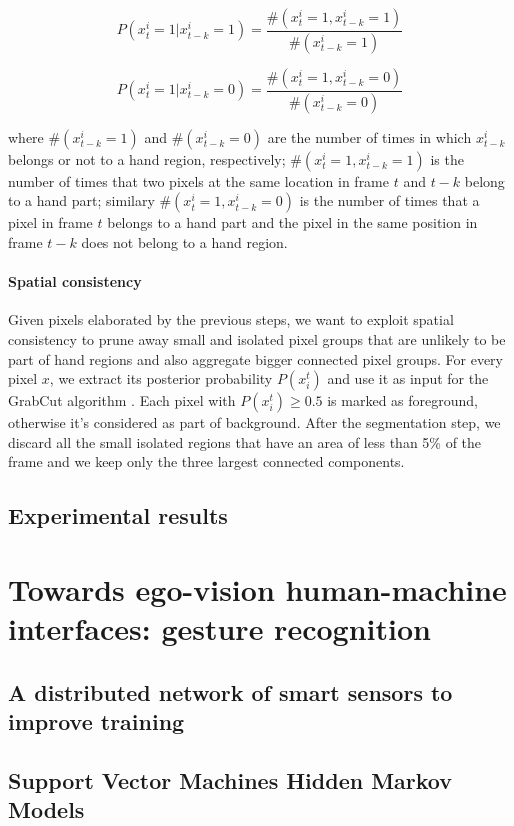 \documentclass[11pt, oneside]{Thesis} %
\begin{document}
\[
P(x_{t}^{i}=1|x_{t-k}^{i}=1)=\frac{\#(x_{t}^{i}=1,x_{t-k}^{i}=1)}{\#(x_{t-k}^{i}=1)}
\]


\begin{equation}
P(x_{t}^{i}=1|x_{t-k}^{i}=0)=\frac{\#(x_{t}^{i}=1,x_{t-k}^{i}=0)}{\#(x_{t-k}^{i}=0)}
\end{equation}


where $\#(x_{t-k}^{i}=1)$ and $\#(x_{t-k}^{i}=0)$ are the number
of times in which $x_{t-k}^{i}$ belongs or not to a hand region,
respectively; $\#(x_{t}^{i}=1,x_{t-k}^{i}=1)$ is the number of times
that two pixels at the same location in frame $t$ and $t-k$ belong
to a hand part; similary $\#(x_{t}^{i}=1,x_{t-k}^{i}=0)$ is the number
of times that a pixel in frame $t$ belongs to a hand part and the
pixel in the same position in frame $t-k$ does not belong to a hand
region. 


\subsubsection{Spatial consistency}

Given pixels elaborated by the previous steps, we want to exploit
spatial consistency to prune away small and isolated pixel groups
that are unlikely to be part of hand regions and also aggregate bigger
connected pixel groups. For every pixel $x$, we extract its posterior
probability $P(x_{i}^{t})$ and use it as input for the GrabCut algorithm
\cite{rother2004grabcut}. Each pixel with $P(x_{i}^{t})\geq0.5$
is marked as foreground, otherwise it's considered as part of background.
After the segmentation step, we discard all the small isolated regions
that have an area of less than 5\% of the frame and we keep only the
three largest connected components.

\section{Experimental results}
\chapter{Towards ego-vision human-machine interfaces: gesture recognition}
\section{A distributed network of smart sensors to improve training}
\section{Support Vector Machines Hidden Markov Models}
\end{document}
